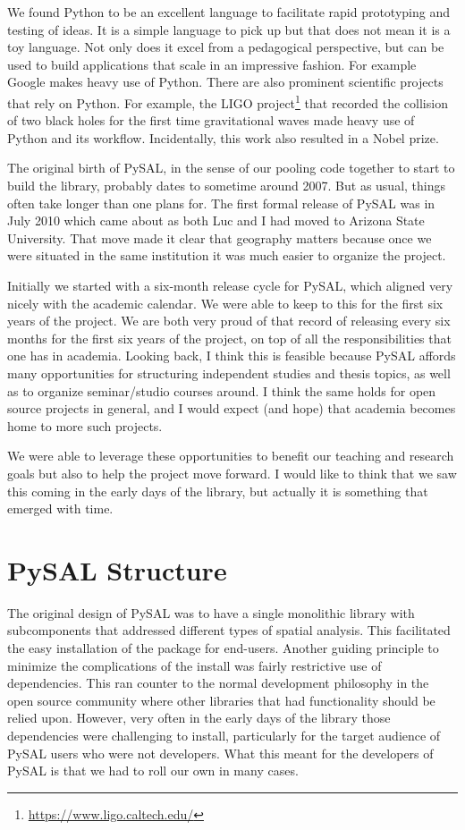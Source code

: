 \documentclass[11pt]{article}
\begin{document}
We found Python to be an excellent language to facilitate rapid prototyping and
testing of ideas. It is a simple language to pick up but that does not mean it
is a toy language. Not only does it excel from a pedagogical perspective, but
can be used to build applications that scale in an impressive fashion. For
example Google makes heavy use of Python. There are also prominent scientific
projects that rely on Python. For example, the LIGO project\footnote{\url{ https://www.ligo.caltech.edu/}} that recorded
the collision of two black holes for the first time gravitational waves made
heavy use of Python and its workflow. Incidentally, this work also resulted in
a Nobel prize.


The original birth of PySAL, in the sense of our pooling code together to start
to build the library, probably dates to sometime around 2007. But as
usual, things often take longer than one plans for. The first formal release of
PySAL was in July 2010 which came about as both Luc and I had moved to Arizona
State University. That move made it clear that geography matters because once
we were situated in the same institution it was much easier to organize the
project.

Initially we started with a six-month release cycle for PySAL, which aligned
very nicely with the academic calendar. We were able to keep to this for the
first six years of the project. We are both very proud of that record of
releasing every six months for the first six years of the project, on top of
all the responsibilities that one has in academia. Looking back, I think this
is feasible because PySAL affords many opportunities for structuring
independent studies and thesis topics, as well as to organize seminar/studio
courses around. I think the same holds for open source projects in general, and
I would expect (and hope) that academia becomes home to more such projects.

We were able to leverage these opportunities to benefit our teaching and
research goals but also to help the project move forward. I would like to think
that we saw this coming in the early days of the library, but actually it is
something that emerged with time.
\section*{PySAL Structure}
\label{sec:org349be7d}
The original design of PySAL was to have a single monolithic library with
subcomponents that addressed different types of spatial analysis. This
facilitated the easy installation of the package for end-users. Another guiding
principle to minimize the complications of the install was fairly restrictive
use of dependencies. This ran counter to the normal development philosophy in
the open source community where other libraries that had functionality should be
relied upon. However, very often in the early days of the library 
those dependencies were challenging to install, particularly for the target
audience of PySAL users who were not developers. What this meant for the
developers of PySAL is that we had to roll our own in many cases.
\end{document}
